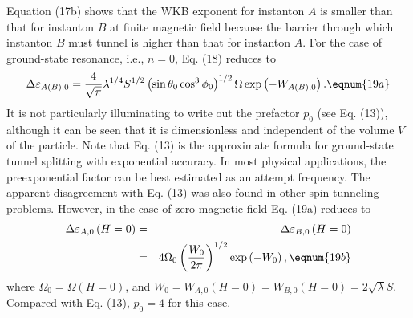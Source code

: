 Equation (17b) shows that the WKB exponent for instanton $A$ is smaller than
that for instanton $B$ at finite magnetic field because the barrier through
which instanton $B$ must tunnel is higher than that for instanton $A$. For
the case of ground-state resonance, i.e., $n=0$, Eq. (18) reduces to 
\begin{equation}
\Delta \varepsilon _{A\left( B\right) ,0}=\frac 4{\sqrt{\pi }}\lambda
^{1/4}S^{1/2}\left( \sin \theta _0\cos ^3\phi _0\right) ^{1/2}\Omega \exp
\left( -W_{A\left( B\right) ,0}\right) .  \eqnum{19a}
\end{equation}
It is not particularly illuminating to write out the prefactor $p_0$ (see
Eq. (13)), although it can be seen that it is dimensionless and independent
of the volume $V$ of the particle. Note that Eq. (13) is the approximate
formula for ground-state tunnel splitting with exponential accuracy. In most
physical applications, the preexponential factor can be best estimated as an
attempt frequency. The apparent disagreement with Eq. (13) was also found in
other spin-tunneling problems.\cite{24} However, in the case of zero
magnetic field Eq. (19a) reduces to 
\begin{eqnarray}
\Delta \varepsilon _{A,0}\left( H=0\right)  &=&\Delta \varepsilon
_{B,0}\left( H=0\right)   \nonumber \\
&=&4\Omega _0\left( \frac{W_0}{2\pi }\right) ^{1/2}\exp \left( -W_0\right) ,
\eqnum{19b}
\end{eqnarray}
where $\Omega _0=\Omega \left( H=0\right) $, and $W_0=W_{A,0}\left(
H=0\right) =W_{B,0}\left( H=0\right) =2\sqrt{\lambda }S$. Compared with Eq.
(13), $p_0=4$ for this case.

